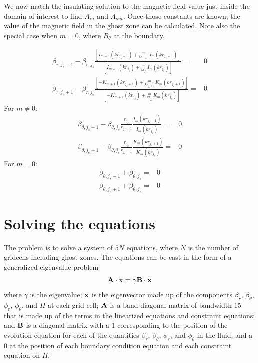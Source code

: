 \documentclass[letterpaper]{article}
\begin{document}
We now match the insulating solution to the magnetic field value just
inside the domain of interest to find $A_{in}$ and $A_{out}$. Once
those constants are known, the value of the magnetic field in the
ghost zone can be calculated. Note also the special case when $m=0$,
where $B_\theta$ at the boundary.

\begin{align}
\beta_{r, j_s-1} - \beta_{r, j_s}
 \frac{\left[I_{m+1}(kr_{j_s-1})+\frac{m}{kr_{j_s-1}}I_{m}(kr_{j_s-1})\right]}
      {\left[I_{m+1}(kr_{j_s})+\frac{m}{kr_{j_s}}I_{m}(kr_{j_s})\right]}
=& 0
\\
\beta_{r, j_e+1} - \beta_{r, j_e}
 \frac{\left[-K_{m+1}(kr_{j_e+1})+\frac{m}{kr_{j_e+1}}K_{m}(kr_{j_e+1})\right]}
      {\left[-K_{m+1}(kr_{j_e})+\frac{m}{kr_{j_e}}K_{m}(kr_{j_e})\right]}
=& 0
\end{align}
For $m \ne 0$:
\begin{align}
\beta_{\theta, j_s-1} - \beta_{\theta, j_s}\frac{r_{j_s}}{r_{j_s-1}}
 \frac{I_m(kr_{j_s-1})}{I_m(kr_{j_s})} =& 0
\\
\beta_{\theta, j_e+1} - \beta_{\theta, j_e}\frac{r_{j_e}}{r_{j_e+1}}
 \frac{K_m(kr_{j_e+1})}{K_m(kr_{j_e})} =& 0
\end{align}
For $m = 0$:
\begin{align}
\beta_{\theta, j_s-1} + \beta_{\theta, j_s} =& 0
\\
\beta_{\theta, j_e+1} + \beta_{\theta, j_e} =& 0
\end{align}

\section{Solving the equations}

The problem is to solve a system of $5N$ equations, where $N$ is the
number of gridcells including ghost zones. The equations can be cast
in the form of a generalized eigenvalue problem
\begin{equation}
{\bf A}\cdot{\bf x} = \gamma {\bf B}\cdot{\bf x}
\end{equation}
where $\gamma$ is the eigenvalue; ${\bf x}$ is the eigenvector made up
of the components $\beta_r$, $\beta_\theta$, $\phi_r$, $\phi_\theta$,
and $\Pi$ at each grid cell; ${\bf A}$ is a band-diagonal matrix of
bandwidth 15 that is made up of the terms in the linearized equations
and constraint equations; and ${\bf B}$ is a diagonal matrix with a 1
corresponding to the position of the evolution equation for each of
the quantities $\beta_r$, $\beta_\theta$, $\phi_r$, and $\phi_\theta$
in the fluid, and a 0 at the position of each boundary condition
equation and each constraint equation on $\Pi$.
\end{document}
